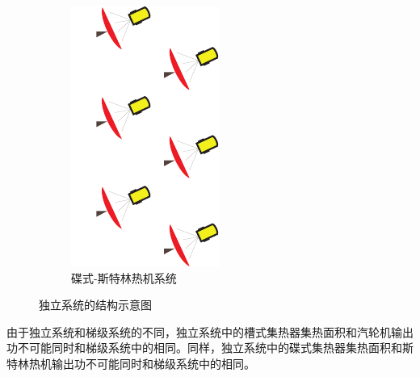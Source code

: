 \begin{figure}[htbp]
\begin{subfigure}[b]{0.26\columnwidth}
	\includegraphics[width = \columnwidth]{fig/Dish-s}
	\caption{碟式-斯特林热机系统}\label{fig:DishStirling}
	\end{subfigure}
	
	\caption{独立系统的结构示意图}\label{fig:Stand-alone-systems}
\end{figure}

	由于独立系统和梯级系统的不同，独立系统中的槽式集热器集热面积和汽轮机输出功不可能同时和梯级系统中的相同。同样，独立系统中的碟式集热器集热面积和斯特林热机输出功不可能同时和梯级系统中的相同。
	
